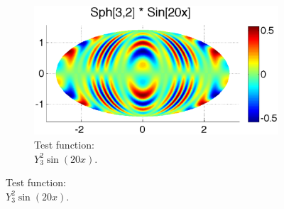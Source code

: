 \begin{figure}
\begin{center}
	\centering
	\begin{subfigure}[t]{0.48\textwidth}
	\centering
	\includegraphics[width=1.0\textwidth]{../figures/appendices/direct_vs_indirect_weights/compare_weight_generation/xsfc_vs_xsfc_alt_on_sph32_times_sine_20x/sph32_times_sin20x.eps}
	\caption{Test function:  \\ $Y_{3}^{2} \sin(20 x) $.  }
	\end{subfigure}
	

\end{center}
\end{figure}

